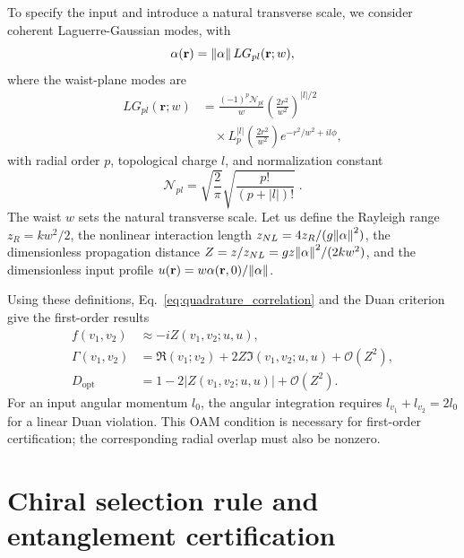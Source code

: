 \documentclass[%
 reprint,
 amsmath,amssymb,
 aps,
pra,
twocolumn,
]{revtex4-2}
\begin{document}
To specify the input and introduce a natural transverse scale, we consider coherent Laguerre-Gaussian modes, with
\begin{equation}
    \alpha(\mathbf r)=\norm{\alpha}\,LG_{pl}(\mathbf r;w),
\end{equation}
where the waist-plane modes are
\begin{equation}
    \begin{aligned}
        LG_{pl}(\mathbf{r}; w) &= \frac{(-1)^p\mathcal{N}_{pl}}{w}
        \left(\frac{2r^2}{w^2}\right)^{|l|/2}\\
        &\quad\times L_p^{|l|}\!\left(\frac{2r^2}{w^2}\right)
        e^{-r^2/w^2+il\phi},
    \end{aligned}
\end{equation}
with radial order $p$, topological charge $l$, and normalization constant
\begin{equation}
    \mathcal{N}_{pl}=\sqrt{\frac{2}{\pi}}\sqrt{\frac{p!}{(p+|l|)!}}\;.
\end{equation}
The waist $w$ sets the natural transverse scale. Let us define the Rayleigh range
$z_R=kw^2/2$, the nonlinear interaction length $z_{NL}=4z_R/(g\norm{\alpha}^2)$,
the dimensionless propagation distance $Z=z/z_{NL}=gz\norm{\alpha}^2/(2kw^2)$,
and the dimensionless input profile $u(\mathbf r)=w\alpha(\mathbf r,0)/\norm{\alpha}$.

Using these definitions, Eq.~\eqref{eq:quadrature_correlation} and the Duan criterion give the first-order results
\begin{equation}
    \begin{aligned}
        f(v_1,v_2)&\approx-iZ(v_1,v_2;u,u),\\
        \Gamma(v_1,v_2)&=\Re(v_1;v_2)+2Z\Im(v_1,v_2;u,u)+\mathcal{O}(Z^2),\\
        D_{\mathrm{opt}}&=1-2\left|Z(v_1,v_2;u,u)\right|+\mathcal{O}(Z^2).
    \end{aligned}
\end{equation}
For an input angular momentum $l_0$, the angular integration requires $l_{v_1}+l_{v_2}=2l_0$ for a linear Duan violation. This OAM condition is necessary for first-order certification; the corresponding radial overlap must also be nonzero.

\section{Chiral selection rule and entanglement certification}
\label{sec:selection rules}
\end{document}
